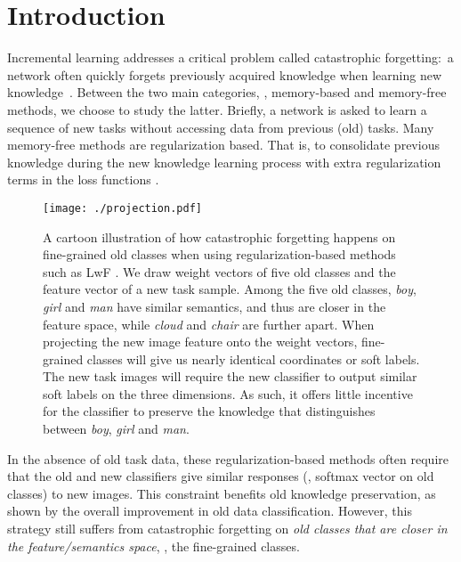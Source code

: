\documentclass[10pt,twocolumn,letterpaper]{article}
\begin{document}
\vspace{-5mm}
\section{Introduction}
Incremental learning addresses a critical problem called catastrophic forgetting:~a network often quickly forgets previously acquired knowledge when learning new knowledge~\cite{masana2020class,belouadah2020comprehensive,delange2021continual}. Between the two main categories, \ie, memory-based and memory-free methods, we choose to study the latter. Briefly, a network is asked to learn a sequence of new tasks without accessing data from previous (old) tasks. Many memory-free methods are regularization based. That is, to consolidate previous knowledge during the new knowledge learning process with extra regularization terms in the loss functions \cite{li2017learning,liumore}. 

\begin{figure}[t]
\begin{center}
 \texttt{[image: ./projection.pdf]}
 \end{center}
 \vspace{-6mm}
\caption{\small{A cartoon illustration of how catastrophic forgetting happens on fine-grained old classes when using regularization-based methods such as LwF \cite{li2017learning}. We draw weight vectors of five old classes and the feature vector of a new task sample. Among the five old classes, \emph{boy}, \emph{girl} and \emph{man} have similar semantics, and thus are closer in the feature space, while \emph{cloud} and \emph{chair} are further apart. When projecting the new image feature onto the weight vectors, fine-grained classes will give us nearly identical coordinates or soft labels. The new task images will require the new classifier to output similar soft labels on the three dimensions. As such, it offers little incentive for the classifier to preserve the knowledge that distinguishes between \emph{boy}, \emph{girl} and \emph{man}.}}
\vspace{-5mm}
\label{projection}
\end{figure}


In the absence of old task data, these regularization-based methods often require that the old and new classifiers give similar responses (\eg, softmax vector on old classes) to new images. This constraint benefits old knowledge preservation, as shown by the overall improvement in  old data classification. 
However, this strategy still suffers from catastrophic forgetting on \emph{old classes that are closer in the feature/semantics space}, \ie, the fine-grained classes.
\end{document}

